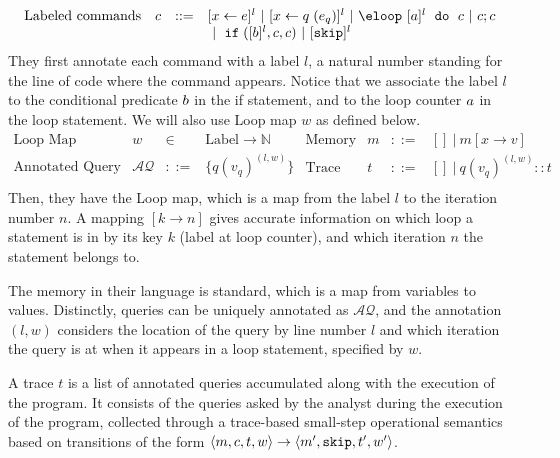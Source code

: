 \[
\begin{array}{llll}
     \mbox{Labeled commands} & c & ::= &   [\assign x \expr]^{l} ~|~  [\assign x q(e_q)]^{l}
 ~|~  \eloop ~ [\aexpr]^{l} ~ \edo ~ c  ~|~ c;c \\
 & & & ~|~ \eif([\bexpr]^l, c, c) 	 ~|~ [\eskip]^{l} \\
\end{array}
\]
They first annotate each command with a label $l$, a natural number standing for the line of code where the command appears. Notice that we associate the label $l$ to the conditional predicate $b$ in the if statement, and to the loop counter $a$ in the loop statement. We will also use  Loop map $w$ as defined below.  
\[
\begin{array}{llll}
 \mbox{Loop Map} & w & \in & \mbox{Label} \to \mathbb{N} \\
\mbox{Annotated Query} & \mathcal{AQ}  & ::= & \{ q(v_q)^{(l,w)}  \} \\
\end{array}
\begin{array}{llll}
    \mbox{Memory} & m & ::= & [] ~|~ m[x \to v] \\
\mbox{Trace} & t & ::= & [] ~|~ q(v_q)^{(l, w) } :: t \\
\end{array}
\]
 Then, they have the Loop map, which is a map from the label $l$ to the iteration number $n$.
  A mapping $[k \to n]$ gives accurate information on which loop a statement is in by its key $k$ (label at loop counter),
  and which iteration $n$ the statement belongs to.

  The memory in their language is standard, which is a map from variables to values.
  Distinctly, queries can be uniquely annotated as $\mathcal{AQ}$, and the annotation $(l,w)$ considers the location of the query by line number $l$ and which iteration the query is at when it appears in a loop statement, specified by $w$.
 
  A trace $t$ is a list of annotated queries accumulated along with the execution of the program. 
  It consists of the queries asked by the analyst during the execution of the program,
collected through
  a trace-based small-step operational semantics based on transitions of the form $ \langle m,c, t, w \rangle \to \langle m', \mathtt{skip}, t', w' \rangle $.

